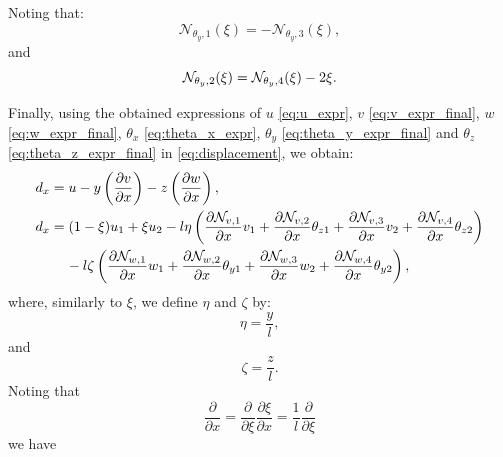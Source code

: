\documentclass[a4paper,11pt]{article}
\begin{document}
Noting that:
\begin{equation}
	\mathcal{N}_{\theta_y,1}(\xi) = - \mathcal{N}_{\theta_y,3}(\xi),
\end{equation}
and
\begin{equation}
	\mathcal{N}_{\theta_y,2}(\xi) = \mathcal{N}_{\theta_y,4}(\xi) - 2\xi. \\
\end{equation}

\newpage

\noindent Finally, using the obtained expressions of $u$ \eqref{eq:u_expr}, $v$
\eqref{eq:v_expr_final}, $w$ \eqref{eq:w_expr_final}, $\theta_x$
\eqref{eq:theta_x_expr}, $\theta_y$ \eqref{eq:theta_y_expr_final} and $\theta_z$
\eqref{eq:theta_z_expr_final} in \eqref{eq:displacement}, we obtain:
\begin{align}
	d_x & = u - y \left(\frac{\partial v}{\partial x}\right) - z \left(\frac{\partial w}{\partial x}\right), \nonumber \\
	d_x & = (1-\xi)u_1 + \xi u_2 - l\eta \left( \frac{\partial \mathcal{N}_{v,1}}{\partial x} v_1 + \frac{\partial \mathcal{N}_{v,2}}{\partial x} \theta_{z1} + \frac{\partial \mathcal{N}_{v,3}}{\partial x} v_2 + \frac{\partial \mathcal{N}_{v,4}}{\partial x} \theta_{z2} \right) \nonumber \\
	& \text{\hspace{4mm}} - l\zeta \left( \frac{\partial \mathcal{N}_{w,1}}{\partial x} w_1 + \frac{\partial \mathcal{N}_{w,2}}{\partial x} \theta_{y1} + \frac{\partial \mathcal{N}_{w,3}}{\partial x} w_2 + \frac{\partial \mathcal{N}_{w,4}}{\partial x} \theta_{y2} \right), \nonumber
\end{align}
where, similarly to $\xi$, we define $\eta$ and $\zeta$ by:
\begin{equation}
	\eta = \frac{y}{l},
\end{equation}
and
\begin{equation}
	\zeta = \frac{z}{l}.
\end{equation}
Noting that
\begin{equation*}
	\frac{\partial}{\partial x} = \frac{\partial}{\partial \xi} \frac{\partial \xi}{\partial x} = \frac{1}{l} \frac{\partial}{\partial \xi}
\end{equation*}
we have
\end{document}
